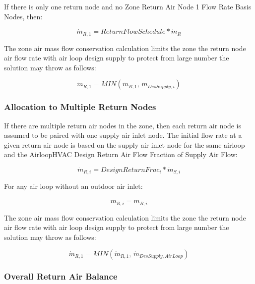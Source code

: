 If there is only one return node and no Zone Return Air Node 1 Flow Rate Basis Nodes, then:

\begin{equation}
{\dot m_{R,1}} = ReturnFlowSchedule*{\dot m_{R}}
\end{equation}

The zone air mass flow conservation calculation limits the zone the return node air flow rate with air loop design supply to protect from large number the solution may throw as follows:

\begin{equation}
{\dot m_{R,1}} = MIN\left( {{\dot m_{R,1}},\,{{\dot m}_{DesSupply,i}}} \right) 
\end{equation}
  

\subsubsection{Allocation to Multiple Return Nodes}\label{allocation-to-multiple-return-nodes}

If there are multiple return air nodes in the zone, then each return air node is assumed to be paired with one supply air inlet node. The initial flow rate at a given return air node is based on the supply air inlet node for the same airloop and the AirloopHVAC Design Return Air Flow Fraction of Supply Air Flow:

\begin{equation}
{\dot m_{R,i}} = {DesignReturnFrac_i} * {\dot m_{S,i}}
\end{equation}

For any air loop without an outdoor air inlet:

\begin{equation}
{\dot m_{R,i}} = {\dot m_{R,i}}
\end{equation}

The zone air mass flow conservation calculation limits the zone the return node air flow rate with air loop design supply to protect from large number the solution may throw as follows:

\begin{equation}
{\dot m_{R,1}} = MIN\left( {{\dot m_{R,1}},\,{{\dot m}_{DesSupply, AirLoop}}} \right) 
\end{equation}

\subsubsection{Overall Return Air Balance}\label{overall-return-air-balance}


